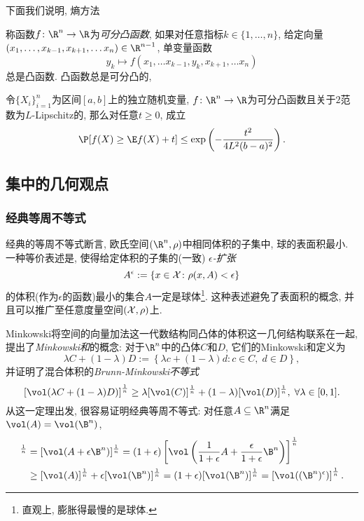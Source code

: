 下面我们说明, 熵方法

称函数$f \colon \R^n \to \R$为\emph{可分凸函数}, 如果对任意指标$k \in \{1, \dots, n\}$, 给定向量$(x_1, \dots, x_{k-1}, x_{k+1}, \dots x_n) \in \R^{n-1}$, 单变量函数
\begin{equation*}
	y_k \mapsto f(x_1, \dots x_{k-1}, y_k, x_{k+1}, \dots x_n)
\end{equation*}
总是凸函数. 
凸函数总是可分凸的, 
\begin{theorem}
	令$\{X_i\}_{i=1}^n$为区间$[a, b]$上的独立随机变量, $f \colon \R^n \to \R$为可分凸函数且关于$2$范数为$L$-Lipschitz的, 那么对任意$t \geq 0$, 成立
	\begin{equation*}
		\P[f(X) \geq \E f(X) + t] 
		\leq \exp \left( - \frac{t^2}{4L^2 (b-a)^2} \right). 
	\end{equation*}
\end{theorem}


\subsection{集中的几何观点}

\subsubsection{经典等周不等式}

经典的等周不等式断言, 欧氏空间$(\R^n, \rho)$中相同体积的子集中, 球的表面积最小. 
一种等价表述是, 使得给定体积的子集的(一致) \emph{$\epsilon$-扩张}
\begin{equation*}
	A^{\epsilon} := \left\{ x \in \mathcal{X} \colon \rho(x, A) < \epsilon \right\}
\end{equation*}
的体积(作为$\epsilon$的函数)最小的集合$A$一定是球体\footnote{直观上, 膨胀得最慢的是球体.}.  
这种表述避免了表面积的概念, 并且可以推广至任意度量空间$(\mathcal{X}, \rho)$上. 

Minkowski将空间的向量加法这一代数结构同凸体的体积这一几何结构联系在一起, 提出了\emph{Minkowski和}的概念: 
对于$\R^n$中的凸体$C$和$D$, 它们的Minkowski和定义为
\begin{equation*}
	\lambda C + (1 - \lambda) D := \left\{ \lambda c + (1 - \lambda) d \colon c \in C,\; d \in D \right\}, 
\end{equation*}
并证明了混合体积的\emph{Brunn-Minkowski不等式}
\begin{equation*}
	\left[ \vol(\lambda C + (1-\lambda) D)  \right]^{\frac1n}
	\geq \lambda [\vol(C)]^{\frac1n} + (1-\lambda) [\vol(D)]^{\frac1n},\;
	\forall \lambda \in [0,1]. 
\end{equation*}
从这一定理出发, 很容易证明经典等周不等式: 对任意$A \subseteq \R^n$满足$\vol(A) = \vol(\B^n)$, 
\begin{align*}
	[\vol(A^{\epsilon})]^{\frac1n}
	&= [\vol(A + \epsilon \B^n)]^{\frac1n}
	= (1+\epsilon) \left[\vol\left(\frac{1}{1+\epsilon} A + \frac{\epsilon}{1+\epsilon} \B^n\right)\right]^{\frac1n} \\
	&\geq [\vol(A)]^{\frac1n} + \epsilon [\vol(\B^n)]^{\frac1n} 
	= (1+\epsilon) [\vol(\B^n)]^{\frac1n} 
	= \left[ \vol((\B^n)^{\epsilon}) \right]^{\frac1n}. 
\end{align*}

